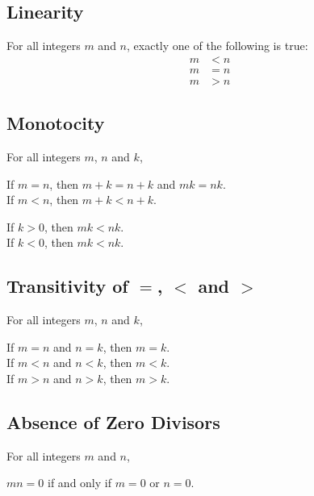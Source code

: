 \documentclass[../notes.tex]{subfiles}
\begin{document}
			\subsection{Linearity}
				For all integers $m$ and $n$, exactly one of the following is true:
				\nopagebreak
				\begin{align*}
					m &< n\\
					m &= n\\
					m &> n
				\end{align*}
			\subsection{Monotocity}
				For all integers $m$, $n$ and $k$,
				\nopagebreak
				\begin{indentparagraph}
					If $m = n$, then $m + k = n + k$ and $mk = nk$.\\
					If $m < n$, then $m + k < n + k$.
					\begin{indentparagraph}
						If $k > 0$, then $mk < nk$.\\
						If $k < 0$, then $mk < nk$.
					\end{indentparagraph}
				\end{indentparagraph}
			\subsection{Transitivity of \texorpdfstring{$=$}{=}, \texorpdfstring{$<$}{<} and \texorpdfstring{$>$}{>}}
				For all integers $m$, $n$ and $k$,
				\nopagebreak
				\begin{indentparagraph}
					If $m = n$ and $n = k$, then $m = k$.\\
					If $m < n$ and $n < k$, then $m < k$.\\
					If $m > n$ and $n > k$, then $m > k$.
				\end{indentparagraph}
			\subsection{Absence of Zero Divisors}
				For all integers $m$ and $n$,
				\nopagebreak
				\begin{indentparagraph}
					$mn = 0$ if and only if $m = 0$ or $n = 0$.
				\end{indentparagraph}
\end{document}
